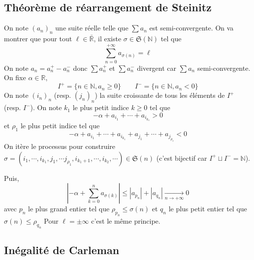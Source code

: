 \subsection{Théorème de réarrangement de Steinitz}


On note $(a_n)_n$ une suite réelle telle que $\sum a_n$ est semi-convergente. On va montrer que pour tout $\ell\in\bar{\mathbb R}$, il existe $\sigma\in\mathfrak S(\mathbb N)$ tel que \[
    \sum_{n=0}^{+\infty}a_{\sigma(n)}=\ell
\]
On note $a_n=a_n^+-a_n^-$ donc $\sum a_n^+$ et $\sum a_n^-$ divergent car $\sum a_n$ semi-convergente. On fixe $\alpha\in\mathbb R$, \[I^+=\{n\in\mathbb N, a_n\geq 0\}\qquad I^-=\{n\in\mathbb N, a_n<0\}\]
On note $(i_n)_n$ (resp. $(j_n)_n$) la suite croissante de tous les éléments de $I^+$ (resp. $I^-$).
On note $k_1$ le plus petit indice $k\geq 0$ tel que \[
    -\alpha+a_{i_1}+\cdots +a_{i_{k_1}}>0
\]
et $\rho_1$ le plus petit indice tel que \[
    -\alpha+a_{i_1}+\cdots +a_{i_{k_1}}+a_{j_1}+\cdots +a_{j_{\rho_1}}<0
\]
On itère le processus pour construire $\sigma=(i_1, \cdots, i_{k_1}, j_1, \cdots j_{\rho_1}, i_{k_1+1}, \cdots, i_{k_2}, \cdots)\in\mathfrak S(n)$ (c'est bijectif car $I^+\sqcup I^-=\mathbb N$).

Puis, \[
    \left| -\alpha+\sum_{k=0}^na_{\sigma(k)} \right|\leq |a_{p_n}|+|a_{q_n}|\xrightarrow[n\to+\infty]{}0
\]
avec $p_n$ le plus grand entier tel que $\rho_{p_n}\leq \sigma(n)$ et $q_n$ le plus petit entier tel que $\sigma(n)\leq \rho_{q_n}$
Pour $\ell=\pm\infty$ c'est le même principe.

\subsection{Inégalité de Carleman}


